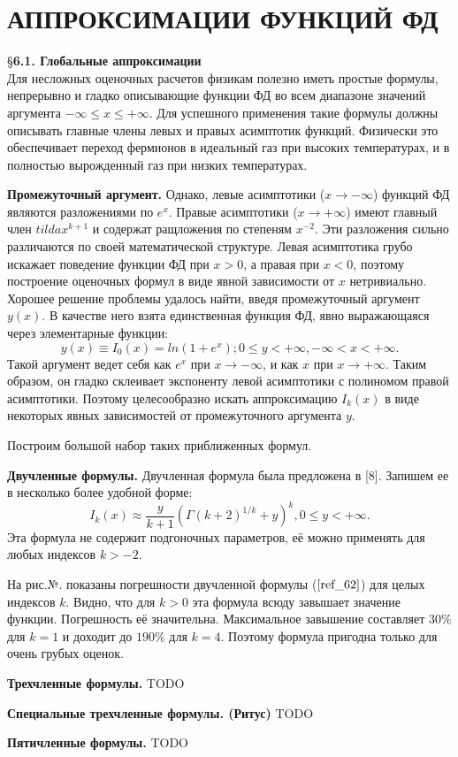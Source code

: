 \chapter{АППРОКСИМАЦИИ ФУНКЦИЙ ФД}

\S \textbf{6.1. Глобальные аппроксимации}
\\

Для несложных оценочных расчетов физикам полезно
иметь простые формулы, непрерывно и гладко описывающие функции ФД во всем диапазоне значений аргумента
$-\infty \leqslant x \leqslant +\infty$. Для успешного применения такие формулы должны описывать главные
члены левых и правых асимптотик функций. Физически это обеспечивает переход фермионов в
идеальный газ при высоких температурах, и в полностью вырожденный газ при низких
температурах.

\textbf{Промежуточный аргумент.} Однако, левые асимптотики ($x \to -\infty$) функций ФД являются разложениями по $e^x$. Правые асимптотики ($x \to +\infty$) имеют главный член $tilda x^{k+1}$ и содержат ращложения по степеням $x^{-2}$. Эти разложения сильно различаются по своей математической структуре. Левая асимптотика грубо искажает поведение функции ФД при $x > 0$, а правая при $x < 0$, поэтому построение оценочных формул в виде явной зависимости от $x$ нетривиально. Хорошее решение проблемы удалось найти, введя промежуточный аргумент $y(x)$. В качестве него взята единственная функция ФД, явно выражающаяся через элементарные функции:
\begin{equation}
y(x) \equiv I_0(x) = ln(1+e^x); 0 \leqslant y < +\infty, -\infty < x < +\infty.
\end{equation}
Такой аргумент ведет себя как $e^x$ при $x \to -\infty$, и как $x$ при $x \to +\infty$. Таким образом, он гладко склеивает экспоненту левой асимптотики с полиномом правой асимптотики. Поэтому целесообразно искать аппроксимацию $I_k(x)$ в виде некоторых явных зависимостей от промежуточного аргумента $y$.

Построим большой набор таких приближенных формул.

\textbf{Двучленные формулы.} Двучленная формула была предложена в [8]. Запишем ее в несколько более удобной
форме:
\begin{equation}
I_k(x) \approx \frac{y}{k+1}(\Gamma(k+2)^{1/k} + y)^k, 0 \leqslant y < +\infty.
\label{ref_62}
\end{equation}
Эта формула не содержит подгоночных параметров, её можно применять для любых индексов $k > -2$.

На рис.№. показаны погрешности двучленной формулы ($\ref{ref_62}$) для целых индексов $k$. Видно, что для $k > 0$ эта формула всюду
завышает значение функции. Погрешность её значительна. Максимальное завышение
составляет $30 \% $ для $k = 1$ и доходит до $190 \%$ для $k = 4$. Поэтому формула пригодна
только для очень грубых оценок.

\textbf{Трехчленные формулы.} TODO

\textbf{Специальные трехчленные формулы. (Ритус)} TODO

\textbf{Пятичленные формулы.} TODO


